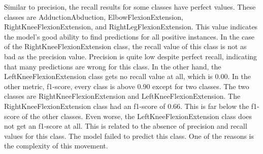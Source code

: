 Similar to precision, the recall results for some classes have perfect values. These classes are AdductionAbduction, ElbowFlexionExtension, RightKneeFlexionExtension, and RightLegFlexionExtension. This value indicates the model's good ability to find predictions for all positive instances. In the case of the RightKneeFlexionExtension class, the recall value of this class is not as bad as the precision value. Precision is quite low despite perfect recall, indicating that many predictions are wrong for this class. In the other hand, the LeftKneeFlexionExtension class gets no recall value at all, which is 0.00. In the other metric, f1-score, every class is above 0.90 except for two classes. The two classes are RightKneeFlexionExtension and LeftKneeFlexionExtension. The RightKneeFlexionExtension class had an f1-score of 0.66. This is far below the f1-score of the other classes. Even worse, the LeftKneeFlexionExtension class does not get an f1-score at all. This is related to the absence of precision and recall values for this class. The model failed to predict this class. One of the reasons is the complexity of this movement.

